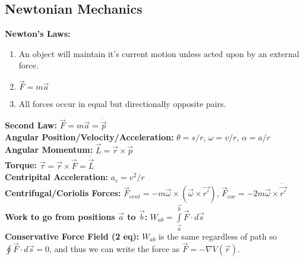 \documentclass[12pt]{extarticle}
\begin{document}
\subsection*{Newtonian Mechanics}
\textbf{Newton's Laws:}
\begin{enumerate}
  \item{An object will maintain it's current motion unless acted upon by an external force.}
  \item{$\vec{F} = m\vec{a}$}
  \item{All forces occur in equal but directionally opposite pairs.}
\end{enumerate}
\textbf{Second Law:} $\vec{F} = m\vec{a} = \dot{\vec{p}}$ \\
\textbf{Angular Position/Velocity/Acceleration:} $\theta = s/r$, $\omega = v/r$, $\alpha = a/r$ \\
\textbf{Angular Momentum:} $\vec{L} = \vec{r} \times \vec{p}$ \\
\textbf{Torque:} $\vec{\tau} = \vec{r} \times \vec{F} = \dot{\vec{L}}$ \\
\textbf{Centripital Acceleration: } $a_c = v^2/r$ \\
\textbf{Centrifugal/Coriolis Forces: } $\vec{F}_{cent} = -m\vec{\omega} \times (\vec{\omega} \times \vec{r'})$, $\vec{F}_{cor} = -2m\vec{\omega} \times \dot{\vec{r'}}$ \\
\textbf{Work to go from positions $\vec{a}$ to $\vec{b}$:} $W_{ab} = \int\limits_{\vec{a}}^{\vec{b}} \vec{F} \cdot d\vec{s}$ \\
\textbf{Conservative Force Field (2 eq):} $W_{ab}$ is the same regardless of path so $\oint \vec{F} \cdot d\vec{s} = 0$, and thus we can write the force as $\vec{F} = -\nabla V(\vec{r})$.
\end{document}
